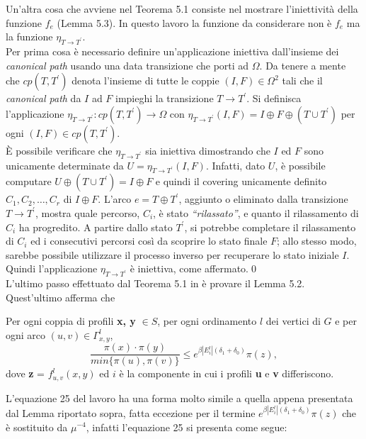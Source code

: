 Un'altra cosa che avviene nel Teorema 5.1 consiste nel mostrare l'iniettività della funzione $f_e$ (Lemma 5.3). In questo lavoro la funzione da considerare non è $f_e$ ma la funzione $\eta_{T \rightarrow T^\prime}$.\\
Per prima cosa è necessario definire un'applicazione iniettiva dall'insieme dei \textit{canonical path} usando una data transizione che porti ad $\Omega$. Da tenere a mente che $cp(T, T^\prime)$ denota l'insieme di tutte le coppie $(I, F) \in \Omega^2$ tali che il \textit{canonical path} da $I$ ad $F$ impieghi la transizione $T \rightarrow T^\prime$. Si definisca l'applicazione $\eta_{T \rightarrow T^\prime} : cp(T, T^\prime) \rightarrow \Omega$ con $\eta_{T \rightarrow T^\prime}(I, F) = I \oplus F \oplus (T \cup T^\prime)$ per ogni $(I, F) \in cp(T, T^\prime)$.\\
È possibile verificare che $\eta_{T \rightarrow T^\prime}$ sia iniettiva dimostrando che $I$ ed $F$ sono unicamente determinate da $U = \eta_{T \rightarrow T^\prime}(I, F)$. Infatti, dato $U$, è possibile computare $U \oplus (T \cup T^\prime) = I \oplus F$ e quindi il covering unicamente definito $C_1, C_2, \ldots, C_r$ di $I \oplus F$. L'arco $e = T \oplus T^\prime$, aggiunto o eliminato dalla transizione $T \rightarrow T^\prime$, mostra quale percorso, $C_i$, è stato \textit{``rilassato''}, e quanto il rilassamento di $C_i$ ha progredito. A partire dallo stato $T^\prime$, si potrebbe completare il rilassamento di $C_i$ ed i consecutivi percorsi così da scoprire lo stato finale $F$; allo stesso modo, sarebbe possibile utilizzare il processo inverso per recuperare lo stato iniziale $I$. Quindi l'applicazione $\eta_{T \rightarrow T^\prime}$ è iniettiva, come affermato.\qed\\
L'ultimo passo effettuato dal Teorema 5.1 in \cite{auletta2011convergence} è provare il Lemma 5.2. Quest'ultimo afferma che
\begin{lem}
	[5.2] Per ogni coppia di profili \textbf{x, y} $\in S$, per ogni ordinamento $l$ dei vertici di $G$ e per ogni arco $(u, v) \in \Gamma^l_{x,y}$,
	\begin{equation}
		\frac{\pi(x)\cdot\pi(y)}{min\{\pi(u), \pi(v)\}} \leq e^{\beta|E_i^l|(\delta_1 + \delta_0)}\pi(z),
	\end{equation}
	dove \textbf{z} = $f_{u,v}^l(x,y)$ ed $i$ è la componente in cui i profili \textbf{u} e \textbf{v} differiscono.
\end{lem}
L'equazione 25 del lavoro \cite{jerrum1993polynomial} ha una forma molto simile a quella appena presentata dal Lemma riportato sopra, fatta eccezione per il termine $e^{\beta|E_i^l|(\delta_1 + \delta_0)}\pi(z)$ che è sostituito da $\mu^{-4}$, infatti l'equazione 25 si presenta come segue:
